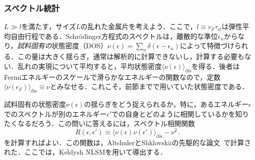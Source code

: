 \documentclass[a4paper,11pt]{ltjsarticle}
\def\tauel{\tau_{\mathrm{el}}}
\begin{document}

\subsubsection{スペクトル統計}\label{app_Part-II-2}



$L\gg
l$を満たす，サイズ$L$の乱れた金属片を考えよう．ここで，$l\equiv v_F\tauel$は弾性平均自由行程である．Schr\"odinger方程式のスペクトルは，離散的な準位$\epsilon_n$からなり，{\em 試料固有の}状態密度（DOS）$\nu(\epsilon)=
\sum_n\delta(\epsilon-\epsilon_n)$によって特徴づけられる．この量は大きく揺らぎ，通常は解析的に計算できないし，計算する必要もない．乱れの実現について平均すると，平均状態密度$\langle\nu(\epsilon)\rangle_{\mathrm{dis}}$を得る．後者はFermiエネルギーのスケールで滑らかなエネルギーの関数なので，定数$\langle\nu(\epsilon_F)\rangle_{\mathrm{dis}}\equiv\nu$とみなせる．これこそ，前節までで用いていた状態密度である．



試料固有の状態密度$\nu(\epsilon)$の揺らぎをどう捉えられるか，特に，あるエネルギー$\epsilon$でのスペクトルが別のエネルギー$\epsilon'$での自身とどのように相関しているかを知りたくなるだろう．この問いに答えるには，スペクトル相関関数
\begin{equation}\label{Part-I-R-def}
R(\epsilon,\epsilon')\equiv\langle\nu(\epsilon)\nu(\epsilon')\rangle_{\mathrm{dis}}
-\nu^2\, .
\end{equation}
を計算すればよい．この関数は，AltshulerとShklovskiiの先駆的な論文~\cite{AltshulerShklovskii}で計算された．ここでは，Keldysh NLSMを用いて導出する．
\end{document}
